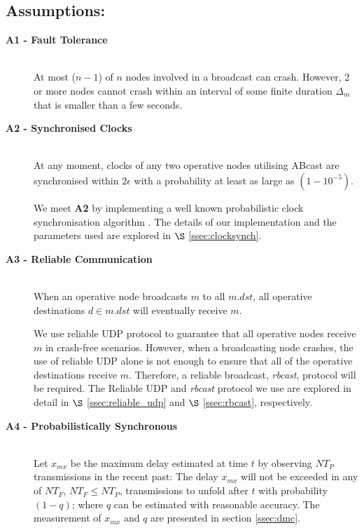     \subsection*{Assumptions:}  
    \begin{description} 
        \item [\textbf{A1 - Fault Tolerance}] \hfill \\
        At most ($n-1$) of $n$ nodes involved in a broadcast can crash. However, 2 or more nodes cannot crash within an interval of some finite duration $\Delta_m$ that is smaller than a few seconds.
        
        \item [\textbf{A2 - Synchronised Clocks}] \hfill \\
        At any moment, clocks of any two operative nodes utilising \textsf{ABcast} are synchronised within $2\epsilon$ with a probability at least as large as $(1-10^{-5})$.
        
        We meet \textbf{A2} by implementing a well known probabilistic clock synchronisation algorithm \citep{Cristian:1996:SA:227210.227231}.  The details of our implementation and the parameters used are explored in $\S$ \ref{ssec:clocksynch}.       
        
        \item [\textbf{A3 - Reliable Communication}] \hfill \\
        When an operative node broadcasts $m$ to all $m.dst$, all operative destinations $d \in m.dst$ will eventually receive $m$.  
        
        We use reliable UDP protocol to guarantee that all operative nodes receive $m$ in crash-free scenarios.  However, when a broadcasting node crashes, the use of reliable UDP alone is not enough to ensure that all of the operative destinations receive $m$.  Therefore, a reliable broadcast, \emph{rbcast}, protocol will be required.  The Reliable UDP and \emph{rbcast} protocol we use are explored in detail in $\S$ \ref{ssec:reliable_udp} and $\S$ \ref{ssec:rbcast}, respectively.  
        
        \item [\textbf{A4 - Probabilistically Synchronous}] \hfill \\
        Let $x_{mx}$ be the maximum delay estimated at time $t$ by observing $NT_P$ transmissions in the recent past: The delay $x_{mx}$ will not be exceeded in any of $NT_F$, $NT_F \leq NT_P$, transmissions to unfold after $t$ with probability $(1 - q)$; where $q$ can be estimated with reasonable accuracy.  The measurement of $x_{mx}$ and $q$ are presented in section \ref{ssec:dmc}.  
        

\end{description}
